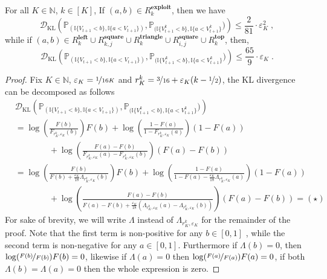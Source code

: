\documentclass[final,12pt]{colt2025}
\newcommand{\cD}{\mathcal{D}}
\newcommand{\I}{\mathbb{I}}
\newcommand{\N}{\mathbb{N}}
\newcommand{\Pb}{\mathbb{P}}
\newcommand{\e}{\varepsilon}
\newcommand{\lrb}[1]{\left(#1\right)}
\newcommand{\one}[1]{\mathbb{I}\{#1\}}
\newcommand{\nZ}{V}
\newcommand{\nb}{b}
\newcommand{\ns}{a}
\begin{document}
\begin{lemma}
\label{lemma:kl-upperbounds}
    For all $K\in\N$, $k\in [K]$, If $(\ns,\nb) \in R^{\textbf{exploit}}_k$, then we have
    \[
        \cD_{\text{KL}} \lrb{
            \Pb_{(\one{\nZ_{t+1} < \nb}, \one{\ns < \nZ_{t+1}}) },\Pb_{(\one{\nZ_{t+1}^k< \nb}, \one{\ns < \nZ_{t+1}^k}})
        }
        \le \frac{2}{81}\cdot \e_K^2 \; ,
    \]
    while if $(\ns,\nb) \in R^{\textbf{left}}_k \cup R^{\textbf{square}}_{k,j} \cup R^{\textbf{triangle}}_{k} \cup R^{\textbf{square}}_{i,j} \cup R^{\textbf{top}}_{k}$, then,
    \[
        \cD_{\text{KL}}
        \lrb{
            \Pb_{(\one{\nZ_{t+1}<b}, \one{\ns < \nZ_{t+1}}) },\Pb_{(\one{\nZ_{t+1}^k<\nb}, \one{\ns < \nZ_{t+1}^k}})
        } \le \frac{65}{9} \cdot \e_K \;.
    \]
\end{lemma}
\begin{proof}
Fix $K \in \mathbb{N}$, $\e_K = \nicefrac{1}{16K}$ and $r^k_K = \nicefrac{3}{16} + \e_K(k - \nicefrac{1}{2})$, the KL divergence can be decomposed as follows
\begin{align*}
&
    \cD_{\text{KL}}
    \lrb{
        \Pb_{(\I\{\nZ_{t+1}<\nb\}, \I\{\ns < \nZ_{t+1}\}) },\Pb_{(\I\{\nZ_{t+1}^k<\nb\}, \I\{\ns < \nZ_{t+1}^k\}})
    } \\
& =
    \log \lrb{
        \frac{F(\nb)}{F_{r^k_K, \e_K}(\nb)}
    } F(\nb)
    + \log \lrb{
        \frac{1 - F(\ns)}{1 - F_{r^k_K, \e_K}(\ns)}
    } (1 - F(\ns)) \\
& \qquad \qquad
    + \log \lrb{
        \frac{F(\ns) - F(\nb)}{F_{r^k_K, \e_K}(\ns) - F_{r^k_K, \e_K}(\nb)}
    } (F(\ns) - F(\nb)) \\
& =
    \log \lrb{
        \frac{F(\nb)}{F(\nb) + \frac{\e_K}{18} \Lambda_{r^k_K, \e_K}(\nb)}
    } F(\nb)
    + \log \lrb{
        \frac{1 - F(\ns)}{1 - F(\ns) - \frac{\e_K}{18} \Lambda_{r^k_K, \e_K}(\ns)}
    } (1 - F(\ns)) \\
& \qquad \qquad
    + \log \lrb{
        \frac{F(\ns) - F(\nb)}{F(\ns) - F(\nb) + \frac{\e_K}{18} (\Lambda_{r^k_K, \e_K}(\ns) - \Lambda_{r^k_K, \e_K}(\nb))}
    } (F(\ns) - F(\nb)) = (\star)
\end{align*}
For sake of brevity, we will write $\Lambda$ instead of $\Lambda_{r^k_K, \e_K}$ for the remainder of the proof. Note that the first term is non-positive for any $\nb \in [0, 1]$ , while the second term is non-negative for any $\ns \in [0, 1]$.
Furthermore if $\Lambda(\nb) = 0$, then $\log(\nicefrac{F(\nb)}{F(\nb)})F(\nb) = 0$, likewise if $\Lambda(\ns) = 0$ then $\log(\nicefrac{F(\ns)}{F(\ns)})F(\ns) = 0$, if both $\Lambda(\nb) = \Lambda(\ns) = 0$ then the whole expression is zero.


\end{proof}
\end{document}

